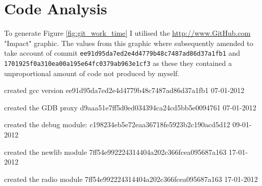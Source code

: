 \chapter{Code Analysis}

To generate Figure \ref{fig:git_work_time} I utilised the \url{http://www.GitHub.com} "Impact" graphic.
The values from this graphic where subsequently amended to take account of commit
\texttt{ee91d95da7ed2e4d4779b48c7487ad86d37a1fb1} and
\texttt{1701925f0a310ea00a195e64fc0379ab963e1cf3} as these they contained a unproportional
amount of code not produced by myself.


created gcc version
  ee91d95da7ed2e4d4779b48c7487ad86d37a1fb1
  07-01-2012

created the GDB proxy
  d9aaa51e7ff5d0ed034394ca24cd5bb5e0094761
  07-01-2012

created the debug module:
  c198234eb5e72eaa36718fe5923b2c190acd5d12
  09-01-2012

created the newlib module
  7ff54e992224314404a202c366fcea095687a163
  17-01-2012

created the radio module
  7ff54e992224314404a202c366fcea095687a163
  17-01-2012

